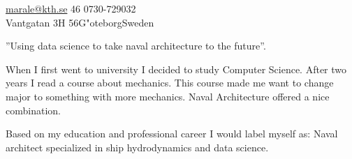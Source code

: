 \documentclass[10pt,a4paper]{article} %
\begin{document}
 



\noindent\href{mailto:marale@kth.se}{marale@kth.se}\bull %
\textsmaller{+}46 0730-729032 %
\\ %
Vantgatan 3H 56\bull G"oteborg\bull Sweden %

\spacedhrule{0.9em}{-0.4em} %



\vspace{-1.3em} %

\setlength\columnsep{30pt}
\begin{multicols}{2}  %

\noindent''Using data science to take naval architecture to the future''.

When I first went to university I decided to study Computer Science. After two years I read a course about mechanics. This course made me want to change major to something with more mechanics. Naval Architecture offered a nice combination. 

Based on my education and professional career I would label myself as: Naval architect specialized in ship hydrodynamics and data science.     

\end{multicols}

\spacedhrule{0.5em}{-0.4em} %

\end{document}
